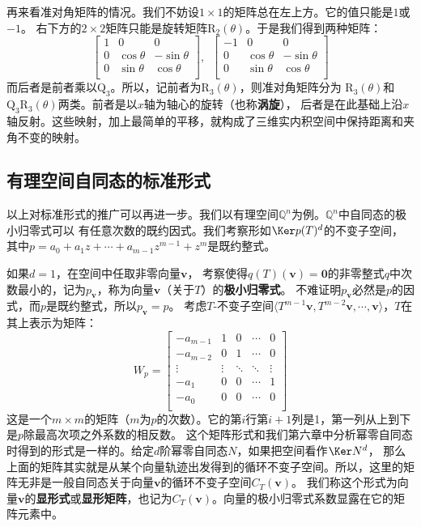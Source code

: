 \documentclass[12pt,UTF8,fontset=none]{ctexbook}
\begin{document}
再来看准对角矩阵的情况。我们不妨设$1\times 1$的矩阵总在左上方。它的值只能是$1$或$-1$。
右下方的$2\times 2$矩阵只能是旋转矩阵$\mathrm{R}_2(\theta)$。于是我们得到两种矩阵：
$$ \begin{bmatrix}
    1 & 0 & 0 \\
    0 & \cos\theta & -\sin\theta \\
    0 & \sin\theta & \cos\theta \\
\end{bmatrix}, \,\,\, \begin{bmatrix}
    -1 & 0 & 0 \\
    0 & \cos\theta & -\sin\theta \\
    0 & \sin\theta & \cos\theta \\
\end{bmatrix}$$
而后者是前者乘以$\mathrm{Q}_3$。所以，记前者为$\mathrm{R}_3(\theta)$，则准对角矩阵分为
$\mathrm{R}_3(\theta)$和$\mathrm{Q}_3\mathrm{R}_3(\theta)$两类。前者是以$x$轴为轴心的旋转（也称\textbf{涡旋}），
后者是在此基础上沿$x$轴反射。这些映射，加上最简单的平移，就构成了三维实内积空间中保持距离和夹角不变的映射。

\subsection{有理空间自同态的标准形式}
以上对标准形式的推广可以再进一步。我们以有理空间$\mathbb{Q}^n$为例。$\mathbb{Q}^n$中自同态的极小归零式可以
有任意次数的既约因式。我们考察形如$\Ker p(T)^{d}$的不变子空间，其中$p = a_0 + a_1z + \cdots + a_{m-1}z^{m-1} + z^m$是既约整式。

如果$d = 1$，在空间中任取非零向量$\mathbf{v}$，
考察使得$q(T)(\mathbf{v}) = \mathbf{0}$的非零整式$q$中次数最小的，记为$p_\mathbf{v}$，称为向量$\mathbf{v}$（关于$T$）的\textbf{极小归零式}。
不难证明$p_\mathbf{v}$必然是$p$的因式，而$p$是既约整式，所以$p_\mathbf{v} = p$。
考虑$T$-不变子空间$\langle T^{m-1}\mathbf{v}, T^{m-2}\mathbf{v}, \cdots , \mathbf{v} \rangle$，$T$在其上表示为矩阵：
$$ W_p = \begin{bmatrix}
    -a_{m-1} & 1 & 0 & \cdots & 0 \\
    -a_{m-2} & 0 & 1 & \cdots & 0 \\
    \vdots & \vdots & \ddots & \ddots & \vdots  \\
    -a_1 & 0 & 0 & \cdots & 1  \\
    -a_0 & 0 & 0 & \cdots & 0 \\
   \end{bmatrix} $$
这是一个$m\times m$的矩阵（$m$为$p$的次数）。它的第$i$行第$i+1$列是1，第一列从上到下是$p$除最高次项之外系数的相反数。
这个矩阵形式和我们第六章中分析幂零自同态时得到的形式是一样的。给定$d$阶幂零自同态$N$，如果把空间看作$\Ker N^d$，
那么上面的矩阵其实就是从某个向量轨迹出发得到的循环不变子空间。所以，这里的矩阵无非是一般自同态关于向量$\mathbf{v}$的循环不变子空间$C_T(\mathbf{v})$。
我们称这个形式为向量$\mathbf{v}$的\textbf{显形式}或\textbf{显形矩阵}，也记为$C_T(\mathbf{v})$。向量的极小归零式系数显露在它的矩阵元素中。
\end{document}

